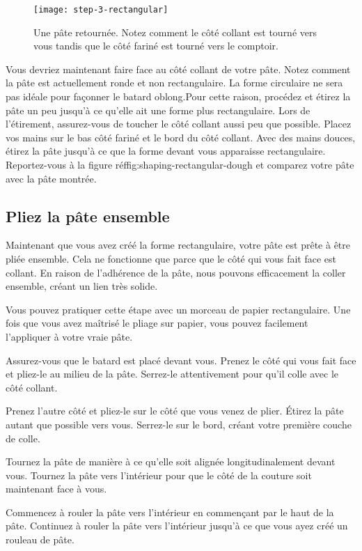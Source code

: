 \begin{figure}[htb!]
  \texttt{[image: step-3-rectangular]}
  \caption[Step 3 of shaping process]{Une pâte retournée. Notez comment le
      côté collant est tourné vers vous tandis que le côté fariné est tourné vers le
      comptoir.}%
  \label{fig:shaping-rectangular-dough}
\end{figure}

Vous devriez maintenant faire face au côté collant de votre pâte. Notez comment
la pâte est actuellement ronde et non rectangulaire. La forme circulaire
ne sera pas idéale pour façonner le batard oblong.Pour cette raison, procédez et étirez la pâte un peu jusqu'à
ce qu'elle ait une forme plus rectangulaire. Lors de l'étirement, assurez-vous de toucher
le côté collant aussi peu que possible. Placez vos mains sur le bas
côté fariné et le bord du côté collant. Avec des mains douces,
étirez la pâte jusqu'à ce que la forme devant vous apparaisse rectangulaire.
Reportez-vous à la figure réf{fig:shaping-rectangular-dough} et comparez
votre pâte avec la pâte montrée.

\subsection[Pliage]{Pliez la pâte ensemble}

Maintenant que vous avez créé la forme rectangulaire, votre pâte
est prête à être pliée ensemble. Cela ne fonctionne que parce que le côté
qui vous fait face est collant. En raison de l'adhérence de la pâte,
nous pouvons efficacement la coller ensemble, créant un lien très
solide.

Vous pouvez pratiquer cette étape avec un morceau de papier rectangulaire.
Une fois que vous avez maîtrisé le pliage sur papier, vous pouvez facilement l'appliquer
à votre vraie pâte.

Assurez-vous que le batard est placé devant vous. Prenez le côté
qui vous fait face et pliez-le au milieu de la pâte. Serrez-le attentivement
pour qu'il colle avec le côté collant.

Prenez l'autre côté et pliez-le sur le côté que vous venez de plier.
Étirez la pâte autant que possible vers vous. Serrez-le
sur le bord, créant votre première couche de colle.

Tournez la pâte de manière à ce qu'elle soit alignée longitudinalement devant vous.
Tournez la pâte vers l'intérieur pour que le côté de la couture
soit maintenant face à vous.

Commencez à rouler la pâte vers l'intérieur en commençant par le haut de la pâte.
Continuez à rouler la pâte vers l'intérieur jusqu'à ce que vous ayez créé un rouleau de pâte.

